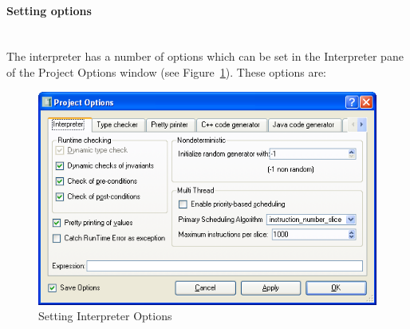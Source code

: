 \documentclass[\pformat,12pt]{article}
\newcommand{\subsubsubsection}[1]{\paragraph{#1}\mbox{}\\}
\newcommand{\guicmd}[1]{{\sf #1}}
\begin{document}
\subsubsubsection{Setting options}


The interpreter has a number of options which can be set in the 
\guicmd{Interpreter} pane of the \guicmd{Project Options} window (see
Figure~\ref{fig:optint}). These options are:

\begin{figure}[tbh]
\begin{center}
\includegraphics[width=12.5cm]{interpreterOptions-ppENG.png}
\caption{Setting Interpreter Options}
\label{fig:optint}
\end{center}
\end{figure}
\end{document}
